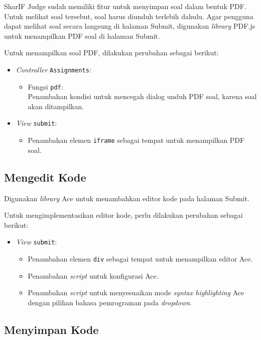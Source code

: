 SharIF Judge sudah memiliki fitur untuk menyimpan soal dalam bentuk PDF. Untuk melihat soal tersebut, soal harus diunduh terlebih dahulu. Agar pengguna dapat melihat soal secara langsung di halaman Submit, digunakan \textit{library} PDF.js untuk menampilkan PDF soal di halaman Submit.

Untuk menampilkan soal PDF, dilakukan perubahan sebagai berikut:
\begin{itemize}
	\item \textit{Controller} \verb|Assignments|:
    \begin{itemize}
		\item Fungsi \verb|pdf|: \\ Penambahan kondisi untuk mencegah dialog unduh PDF soal, karena soal akan ditampilkan.
    \end{itemize}
    \item \textit{View} \verb|submit|:
    \begin{itemize}
        \item Penambahan elemen \verb|iframe| sebagai tempat untuk menampilkan PDF soal.
    \end{itemize}
\end{itemize}

\subsection{Mengedit Kode}
\label{subsec:4:editor}

Digunakan \textit{library} Ace untuk menambahkan editor kode pada halaman Submit.

Untuk mengimplementasikan editor kode, perlu dilakukan perubahan sebagai berikut:
\begin{itemize}
    \item \textit{View} \verb|submit|:
    \begin{itemize}
        \item Penambahan elemen \verb|div| sebagai tempat untuk menampilkan editor Ace.
        \item Penambahan \textit{script} untuk konfigurasi Ace.
        \item Penambahan \textit{script} untuk menyesuaikan mode \textit{syntax highlighting} Ace dengan pilihan bahasa pemrograman pada \textit{dropdown}.
    \end{itemize}
\end{itemize}

\subsection{Menyimpan Kode}
\label{subsec:4:simpan}

